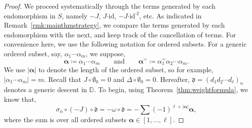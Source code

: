 \documentclass[10pt,a4paper]{amsart}
\newcommand*{\balpha}{\boldsymbol{\alpha}}
\newcommand*{\cendot}{\boldsymbol{\cdot}}
\newcommand*{\df}{\mathfrak d}
\newcommand*{\id}{{\mathrm{id}}}
\begin{document}
\begin{proof}
We proceed systematically through the terms generated by each endomorphism in $S$, namely $-J$, $J\cendot\id$, $-J\cendot\id^{\cendot2}$, etc. 
As indicated in Remark~\ref{rmk:mainthmstrategy}, we compare the terms generated by each endomorphism with the next, and keep track of the cancellation of terms.
For convenience here, we use the following notation for ordered subsets.
For a generic ordered subset, say, $\alpha_1\cdots\alpha_m$, we suppose,
\begin{equation*}
\balpha\coloneqq\alpha_1\cdots\alpha_m\qquad\text{and}\qquad\balpha^=\coloneqq\alpha_1^=\alpha_2\cdots\alpha_m.
\end{equation*}
We use $|\balpha|$ to denote the length of the ordered subset, so for example, $|\alpha_1\cdots\alpha_m|=m$.
Recall that $J\circ\emptyset_0=0$ and $\Delta\circ\emptyset_0=0$.
Hereafter, $\df=(d_1d_2\cdots d_\ell)_n$ denotes a generic descent in $\mathbb D$.
To begin, using Theorem~\ref{thm:weightformula}, we know that,
\begin{equation}\label{eq:mainstep1}
  \sigma_n\circ(-J)\circ\df=-\omega\circ\df=-\sum(-1)^{\ell+|\balpha|}\balpha,
\end{equation}
where the sum is over all ordered subsets $\balpha\in[1,\ldots,\ell]$.


\end{proof}
\end{document}
